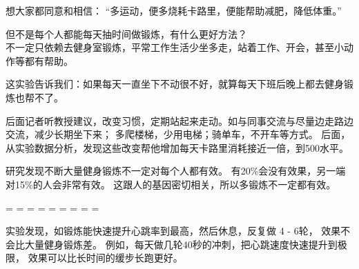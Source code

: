 想大家都同意和相信：
``多运动，便多烧耗卡路里，便能帮助减肥，降低体重。''



但不是每个人都能每天抽时间做锻炼，有什么更好方法？\\
不一定只依赖去健身室锻炼，平常工作生活少坐多走，站着工作、开会，甚至小动作等都有帮助。


这实验告诉我们：如果每天一直坐下不动很不好，就算每天下班后晚上都去健身锻炼也帮不了。

后面记者听教授建议，改变习惯，定期站起来走动。如与同事交流与尽量边走路边交流，减少长期坐下来；
多爬楼梯，少用电梯；骑单车，不开车等方式。
后面，从实验数据分析，发现这些改变帮他增加每天卡路里消耗接近一倍，到500水平。

研究发现不断大量健身锻炼不一定对每个人都有效。
有20\%会没有效果，另一端对15\%的人会非常有效。
这跟人的基因密切相关，所以多锻炼不一定都有效。

\begin{description}
\tightlist
\item[]
= = = = = = = = =
\end{description}

实验发现，如锻炼能快速提升心跳率到最高，然后休息，反复做 4 - 6轮，
效果不会比大量健身锻炼差。
例如，每天做几轮40秒的冲刺，把心跳速度快速提升到极限，
效果可以比长时间的缓步长跑更好。

